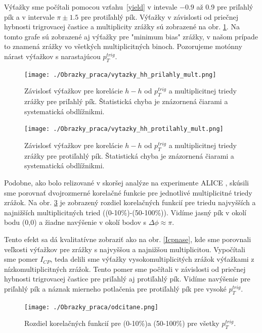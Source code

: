 \documentclass[thesismargins, thesislinespacing]{rnthesis}
\begin{document}
Výťažky sme počítali pomocou vzťahu~\ref{yield} v intevale $-0.9$ až 0.9 pre priľahlý pík a v intervale $\pi\pm1.5$ pre protiľahlý pík. Výťažky v závislosti od priečnej hybnosti trigrovacej častice a multiplicity zrážky sú zobrazené na obr.  \ref{hhmult}. Na tomto grafe sú zobrazené aj výťažky pre "minimum bias" zrážky, v našom prípade to znamená zrážky vo všetkých multiplicitných binoch. Pozorujeme motónny nárast výťažkov s narastajúcou $p_{T}^{trig}$.

\begin{figure}
	\centering
		\texttt{[image: ./Obrazky\_praca/vytazky\_hh\_prilahly\_mult.png]}
		\caption{}
		\label{hhpril}
	\caption{Závislosť výťažkov pre korelácie $h - h$ od $p_T^{trig}$ a multiplicitnej triedy zrážky pre priľahlý pík. Štatistická chyba je znázornená čiarami a systematická obdlížnikmi.}
	\label{hhmult}
\end{figure}

\begin{figure}
	\centering
	\texttt{[image: ./Obrazky\_praca/vytazky\_hh\_protilahly\_mult.png]}
	\caption{}
	\label{hhproti}
	\caption{Závislosť výťažkov pre korelácie $h - h$ od $p_T^{trig}$ a multiplicitnej triedy zrážky pre protiľahlý pík. Štatistická chyba je znázornená čiarami a systematická obdlížnikmi.}
\end{figure}

Podobne, ako bolo relizované v skoršej analýze na experimente ALICE \cite{AlicepPb}, skúsili sme porovnať dvojrozmerné korelačné funkcie pre jednotlivé multiplicitné triedy zrážok. Na obr. \ref{multroz} je zobrazený rozdiel korelačných funkcií pre triedu najvyšších a najnižších multiplicitných tried ((0-10\%)-(50-100\%)). Vidíme jasný pík v okolí bodu (0,0) a žiadne navýšenie v okolí bodov s $\Delta\phi \approx \pi$.

Tento efekt sa dá kvalitatívne zobraziť ako na obr. \ref{Icpnase}, kde sme porovnali veľkosti výťažkov pre zrážky s najvyššou a najnižšou multiplicitou. Vypočítali sme pomer $I_{CP}$,  teda delili sme  výťažky vysokomultiplicitých zrážok výťažkami  z nízkomultiplicitných zrážok. Tento pomer sme počítali v závislosti od priečnej hybnosti trigrovacej častice pre priľahlý aj protiľahlý pík. Vidíme navýšenie pre priľahlý pík a náznak mierneho potlačenia pre protiľahlý pík pre vysoké $p_T^{trig}$. 

\begin{figure}[hbtp!]
	\centering
	\texttt{[image: ./Obrazky\_praca/odcitane.png]}
	\caption{Rozdiel korelačných funkcií pre (0-10\%)a (50-100\%) pre všetky $p_T^{trig}$.}
	\label{multroz}
\end{figure}
\end{document}
